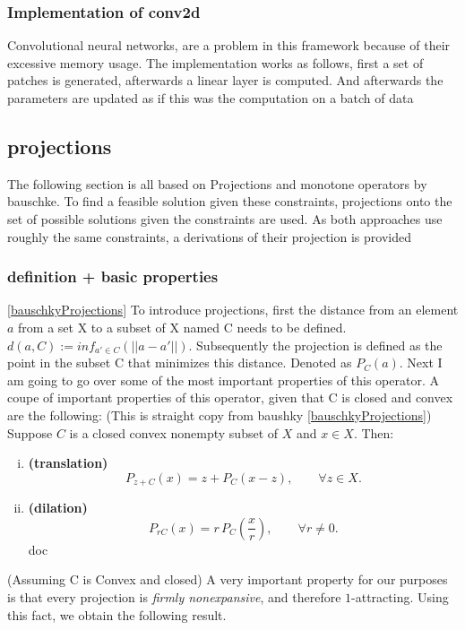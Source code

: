 \subsubsection{Implementation of conv2d}
Convolutional neural networks, are a problem in this framework because of their excessive memory usage. The implementation works as follows, first a set of patches is generated, afterwards a linear layer is computed. And afterwards the parameters are updated as if this was the computation on a batch of data
\newpage
\subsection{projections}
The following section is all based on Projections and monotone operators by bauschke.
To find a feasible solution given these constraints, projections onto the set of possible solutions given the constraints are used. As both approaches use roughly the same constraints, a derivations of their projection is provided
\subsubsection{definition + basic properties}\ref{bauschkyProjections}
To introduce projections, first the distance from an element $a$ from a set X to a subset of X named C needs to be defined.
$d(a,C) := inf_{a'\in C}(||a-a'||)$.
Subsequently the projection is defined as the point in the subset C that minimizes this distance. Denoted as $P_C(a)$.
Next I am going to go over some of the most important properties of this operator.
A coupe of important properties of this operator, given that C is closed and convex are the following:
(This is straight copy from baushky \ref{bauschkyProjections})\\
Suppose \(C\) is a closed convex nonempty subset of \(X\) and \(x \in X\). Then:

\begin{enumerate}[(i)]
    \item \textbf{(translation)}  
    \[
        P_{z + C}(x) = z + P_C(x - z), \qquad \forall z \in X .
    \]

    \item \textbf{(dilation)}  
    \[
        P_{rC}(x) = r \, P_C\!\left(\frac{x}{r}\right), \qquad \forall r \neq 0 .
    \]
doc
\end{enumerate}

(Assuming C is Convex and closed)
A very important property for our purposes is that every projection is 
\emph{firmly nonexpansive}, and therefore \(1\)-attracting. 
Using this fact, we obtain the following result.

